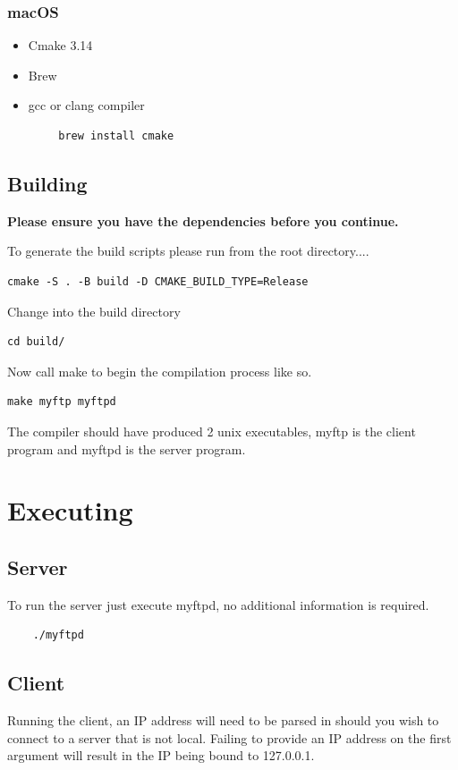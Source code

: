 \documentclass{article}
\begin{document}
\subsubsection*{macOS}
\begin{itemize}
    \item Cmake 3.14
    \item Brew
    \item gcc or clang compiler
\end{itemize}
\begin{lstlisting}
        brew install cmake
\end{lstlisting}
\subsection{Building}
\begin{center}
\textbf{Please ensure you have the dependencies before you continue.}
\end{center}
To generate the build scripts please run from the root directory....
\begin{lstlisting}
cmake -S . -B build -D CMAKE_BUILD_TYPE=Release    
\end{lstlisting}
Change into the build directory
\begin{lstlisting}
cd build/    
\end{lstlisting}
Now call make to begin the compilation process like so.
\begin{lstlisting}
make myftp myftpd    
\end{lstlisting}
The compiler should have produced 2 unix executables, myftp is the client program and myftpd is the server program.
\section{Executing}
\subsection{Server}
To run the server just execute myftpd, no additional information is required.
\begin{lstlisting}
    ./myftpd
\end{lstlisting}
\subsection{Client}
Running the client, an IP address will need to be parsed in should you wish to connect to a server that is not local. Failing to provide an IP address on the first argument will result in the IP being bound to 127.0.0.1. 
\end{document}
